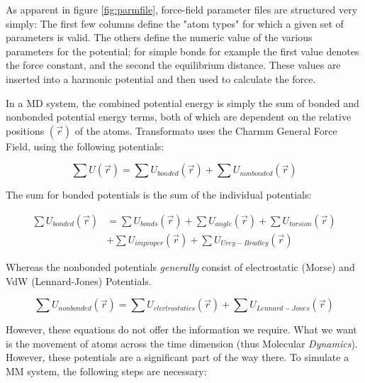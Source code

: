 \documentclass[oneside]{scrreprt}
\begin{document}
As apparent in figure \ref{fig:parmfile}, force-field parameter files are structured very simply: The first few columns define the "atom types" for which a given set of parameters is valid. The others define the numeric value of the various parameters for the potential; for simple bonds for example the first value denotes the force constant, and the second the equilibrium distance. These values are inserted into a harmonic potential and then used to calculate the force. 


In a MD system, the combined potential energy is simply the sum of bonded and nonbonded potential energy terms, both of which are dependent on the relative positions $(\Vec{r})$ of the atoms. Transformato uses the Charmm General Force Field\cite{vanommeslaeghe_charmm_2010}, using the following potentials:


\begin{equation}
    \sum U (\Vec{r}) = \sum U_{bonded} (\Vec{r}) + \sum U_{nonbonded} (\Vec{r})
\end{equation}

The sum for bonded potentials is the sum of the individual potentials:

\begin{equation}
\begin{aligned}
    \sum U_{bonded} (\Vec{r})&= \sum U_{bonds} (\Vec{r}) + \sum U_{angle} (\Vec{r}) + \sum U_{torsion} (\Vec{r}) \\
    &+\sum U_{improper} (\Vec{r})+\sum U_{Urey-Bradley} (\Vec{r})
\end{aligned}
\end{equation}

Whereas the nonbonded potentials \emph{generally} consist of electrostatic (Morse) and VdW (Lennard-Jones) Potentials.

\begin{equation}
    \sum U_{nonbonded} (\Vec{r})=\sum U_{electrostatics} (\Vec{r}) + \sum U_{Lennard-Jones} (\Vec{r})
\end{equation}


However, these equations do not offer the information we require. What we want is the movement of atoms across the time dimension (thus Molecular \emph{Dynamics}). However, these potentials are a significant part of the way there. To simulate a MM system, the following steps are necessary:
\end{document}
